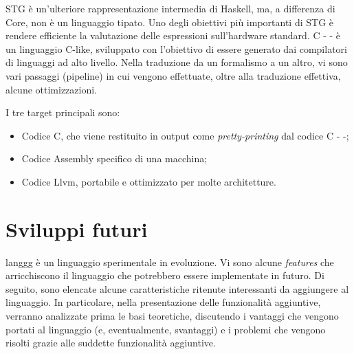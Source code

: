 \documentclass[10pt,a4paper]{article}
\begin{document}
\newline

STG è un'ulteriore rappresentazione intermedia di Haskell, ma, a differenza di Core, non è un linguaggio tipato.
Uno degli obiettivi più importanti di STG è rendere efficiente la valutazione delle espressioni sull'hardware standard.
C - - è un linguaggio C-like, sviluppato con l'obiettivo di essere generato dai compilatori di linguaggi ad alto livello.
Nella traduzione da un formalismo a un altro, vi sono vari passaggi (pipeline) in cui vengono effettuate, oltre alla
traduzione effettiva, alcune ottimizzazioni.

I tre target principali sono:
\begin{itemize}
    \item Codice C, che viene restituito in output come \textit{pretty-printing} dal codice C - -;
    \item Codice Assembly specifico di una macchina;
    \item Codice Llvm, portabile e ottimizzato per molte architetture.
\end{itemize}

\section{Sviluppi futuri}
langgg è un linguaggio sperimentale in evoluzione. Vi sono alcune \textit{features} che arricchiscono il linguaggio che
potrebbero essere implementate in futuro. Di seguito, sono elencate alcune caratteristiche ritenute interessanti da
aggiungere al linguaggio. In particolare, nella presentazione delle funzionalità aggiuntive, verranno analizzate prima le
basi teoretiche, discutendo i vantaggi che vengono portati al linguaggio (e, eventualmente, svantaggi) e i problemi
che vengono risolti grazie alle suddette funzionalità aggiuntive.
\end{document}
